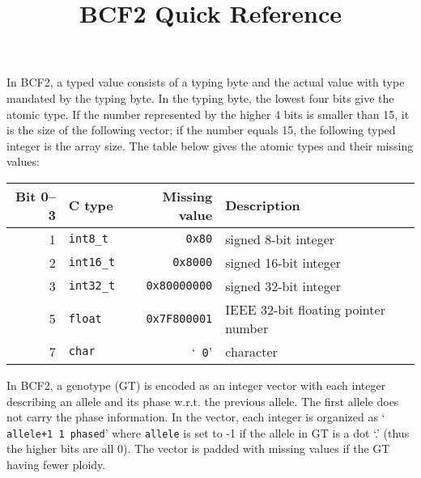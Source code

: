 \documentclass[10pt]{article}
\title{BCF2 Quick Reference}
\author{}
\date{}
\begin{document}
\maketitle

{\small
In BCF2, a typed value consists of a typing byte and the actual value with type
mandated by the typing byte. In the typing byte, the lowest four bits give the
atomic type. If the number represented by the higher 4 bits is smaller than 15,
it is the size of the following vector; if the number equals 15, the following
typed integer is the array size. The table below gives the atomic types and
their missing values:
\begin{center}
{\small\begin{tabular}{rlrl}
\hline
Bit 0--3 & C type & Missing value & Description \\
\hline
1 & {\tt int8\_t}   & {\tt 0x80}               & signed 8-bit integer \\
2 & {\tt int16\_t}  & {\tt 0x8000}             & signed 16-bit integer \\
3 & {\tt int32\_t}  & {\tt 0x80000000}         & signed 32-bit integer \\
5 & {\tt float}     & {\tt 0x7F800001}         & IEEE 32-bit floating pointer number \\
7 & {\tt char}      & `{\tt \char92 0}'        & character \\
\hline
\end{tabular}}
\end{center}

In BCF2, a genotype (GT) is encoded as an integer vector with each integer
describing an allele and its phase w.r.t. the previous allele. The first allele
does not carry the phase information. In the vector, each integer is organized
as `{\tt {} allele+1 1 phased}' where
{\tt allele} is set to -1 if the allele in GT is a dot `.' (thus the higher
bits are all 0). The vector is padded with missing values if the GT having fewer ploidy.
}
\end{document}
